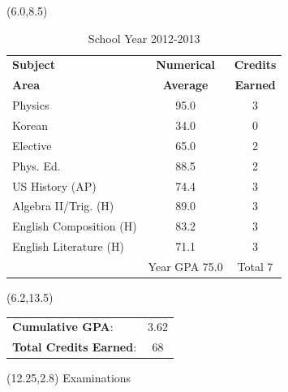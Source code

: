 \documentclass [] {report}
\begin{document}
\begin{textblock}{5}(6.0,8.5)
\begin{table}
\caption{School Year 2012-2013}
\centering
\begin{tabularx}{\textwidth}{ X c c }
\toprule
{\bf Subject} & \multicolumn{1}{c}{\bf Numerical} & {\bf Credits} \\
{\bf Area}& \multicolumn{1}{c}{\bf Average} & {\bf Earned} \\
\midrule
Physics & 95.0 & 3 \\
Korean & 34.0 &  0 \\
Elective\footnotemark[2]& 65.0 & 2 \\
Phys. Ed. & 88.5 & 2 \\
US History (AP) & 74.4 & 3 \\
Algebra II/Trig. (H) & 89.0 & 3\\
English Composition (H) & 83.2 & 3 \\
English Literature (H) & 71.1 & 3 \\
\midrule
 & Year GPA 75.0 &  Total 7 \\
\bottomrule
\end{tabularx}
\end{table}
\end{textblock}

\begin{textblock}{5}(6.2,13.5)
\large
\begin{table}
\begin{tabular}{ l c  }
{\bf Cumulative GPA}: & 3.62 \\
{\bf Total Credits Earned}: & 68 \\
\end{tabular}
\end{table}
\end{textblock}



\begin{textblock}{10}(12.25,2.8)
{\huge Examinations}
\end{textblock}
\end{document}
